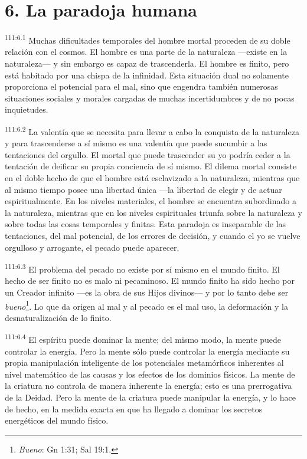 \documentclass[twoside, 11pt]{book}
\begin{document}
\section*{6. La paradoja humana}
\par
\textsuperscript{111:6.1} Muchas dificultades temporales del hombre mortal proceden de su doble relación con el cosmos. El hombre es una parte de la naturaleza ---existe en la naturaleza--- y sin embargo es capaz de trascenderla. El hombre es finito, pero está habitado por una chispa de la infinidad. Esta situación dual no solamente proporciona el potencial para el mal, sino que engendra también numerosas situaciones sociales y morales cargadas de muchas incertidumbres y de no pocas inquietudes.

\par
\textsuperscript{111:6.2} La valentía que se necesita para llevar a cabo la conquista de la naturaleza y para trascenderse a sí mismo es una valentía que puede sucumbir a las tentaciones del orgullo. El mortal que puede trascender su yo podría ceder a la tentación de deificar su propia conciencia de sí mismo. El dilema mortal consiste en el doble hecho de que el hombre está esclavizado a la naturaleza, mientras que al mismo tiempo posee una libertad única ---la libertad de elegir y de actuar espiritualmente. En los niveles materiales, el hombre se encuentra subordinado a la naturaleza, mientras que en los niveles espirituales triunfa sobre la naturaleza y sobre todas las cosas temporales y finitas. Esta paradoja es inseparable de las tentaciones, del mal potencial, de los errores de decisión, y cuando el yo se vuelve orgulloso y arrogante, el pecado puede aparecer.

\par
\textsuperscript{111:6.3} El problema del pecado no existe por sí mismo en el mundo finito. El hecho de ser finito no es malo ni pecaminoso. El mundo finito ha sido hecho por un Creador infinito ---es la obra de sus Hijos divinos--- y por lo tanto debe ser \textit{bueno}\footnote{\textit{Bueno}: Gn 1:31; Sal 19:1.}. Lo que da origen al mal y al pecado es el mal uso, la deformación y la desnaturalización de lo finito.

\par
\textsuperscript{111:6.4} El espíritu puede dominar la mente; del mismo modo, la mente puede controlar la energía. Pero la mente sólo puede controlar la energía mediante su propia manipulación inteligente de los potenciales metamórficos inherentes al nivel matemático de las causas y los efectos de los dominios físicos. La mente de la criatura no controla de manera inherente la energía; esto es una prerrogativa de la Deidad. Pero la mente de la criatura puede manipular la energía, y lo hace de hecho, en la medida exacta en que ha llegado a dominar los secretos energéticos del mundo físico.
\end{document}
